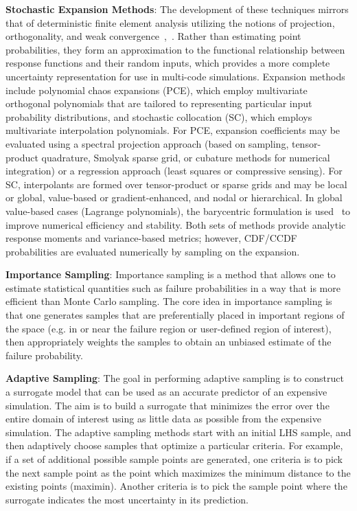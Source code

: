 \textbf{Stochastic Expansion Methods}: %
The development of these techniques mirrors that of deterministic
finite element analysis utilizing the notions of projection,
orthogonality, and weak convergence~\cite{Gha99},~\cite{Gha91}. Rather
than estimating point probabilities, they form an approximation to the
functional relationship between response functions and their random
inputs, which provides a more complete uncertainty representation for
use in multi-code simulations. Expansion methods include polynomial
chaos expansions (PCE), which employ multivariate orthogonal
polynomials that are tailored to representing particular input
probability distributions, and stochastic collocation (SC), which
employs multivariate interpolation polynomials.  For PCE, expansion
coefficients may be evaluated using a spectral projection approach
(based on sampling, tensor-product quadrature, Smolyak sparse grid, or
cubature methods for numerical integration) or a regression approach
(least squares or compressive sensing). For SC, interpolants are
formed over tensor-product or sparse grids and may be local or global,
value-based or gradient-enhanced, and nodal or hierarchical. In global
value-based cases (Lagrange polynomials), the barycentric formulation
is used~\cite{BerTref04,Klimke05,Higham04} to improve numerical
efficiency and stability.  Both sets of methods provide analytic
response moments and variance-based metrics; however, CDF/CCDF
probabilities are evaluated numerically by sampling on the expansion.

\textbf{Importance Sampling}: Importance sampling is a method that 
allows one to estimate statistical quantities such as failure 
probabilities in a way that is more efficient than Monte Carlo 
sampling. The core idea in importance sampling is that one generates 
samples that are preferentially placed in important regions of the 
space (e.g. in or near the failure region or user-defined region
of interest), then appropriately weights the samples to obtain an 
unbiased estimate of the failure probability.

\textbf{Adaptive Sampling}: The goal in performing adaptive 
sampling is to construct a surrogate
model that can be used as an accurate predictor of an expensive 
simulation. The aim is to build a surrogate that minimizes the error
over the entire domain of interest using as little data as possible 
from the expensive simulation. The adaptive sampling methods start
with an initial LHS sample, and then adaptively choose samples that 
optimize a particular criteria. For example, if a set of additional 
possible sample points are generated, one criteria is to pick the
next sample point as the point which maximizes the minimum distance 
to the existing points (maximin). Another criteria is to pick the 
sample point where the surrogate indicates the most uncertainty 
in its prediction. 

